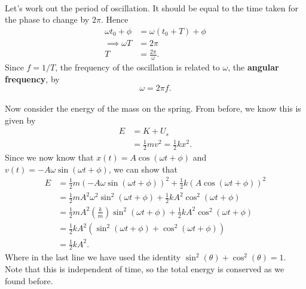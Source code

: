 \documentclass[../newtonian_mechanics.tex]{subfiles}
\begin{document}
        \paragraph{}
        Let's work out the period of oscillation.
        It should be equal to the time taken for the phase to change by $2\pi$.
        Hence
        \begin{align}
            \omega t_0 + \phi &= \omega(t_0 + T) + \phi\\
            \implies \omega T &= 2\pi\\
            T &= \frac{2\pi}{\omega}.
        \end{align}
        Since $f=1/T$, the frequency of the oscillation is related to $\omega$, the \textbf{angular frequency}, by
        \begin{equation}
            \omega = 2\pi f.
        \end{equation}

        \paragraph{}
        Now consider the energy of the mass on the spring. From before, we know this is given by
        \begin{align}
            E &= K + U_s\\
            &=\frac{1}{2}mv^2=\frac{1}{2}kx^2.
        \end{align}
        Since we now know that $x(t)=A\cos(\omega t+\phi)$ and $v(t)=-A\omega\sin(\omega t+\phi)$, we can show that
        \begin{align}
            E &=\frac{1}{2}m(-A\omega\sin(\omega t+\phi))^2+\frac{1}{2}k(A\cos(\omega t+\phi))^2\\
            &=\frac{1}{2}mA^2\omega^2\sin^2(\omega t+\phi)+\frac{1}{2}kA^2\cos^2(\omega t+\phi)\\
            &=\frac{1}{2}mA^2\left(\frac{k}{m}\right)\sin^2(\omega t+\phi)+\frac{1}{2}kA^2\cos^2(\omega t+\phi)\\
            &=\frac{1}{2}kA^2\left(\sin^2(\omega t+\phi)+\cos^2(\omega t+\phi)\right)\\
            &=\frac{1}{2}kA^2.
        \end{align}
        Where in the last line we have used the identity $\sin^2(\theta)+\cos^2(\theta)=1$.
        Note that this is independent of time, so the total energy is conserved as we found before.
\end{document}
